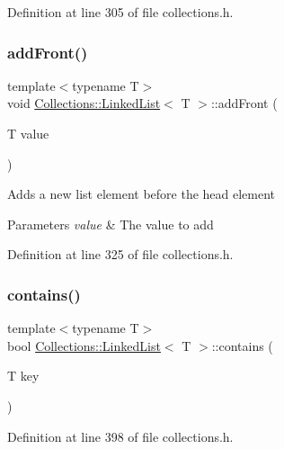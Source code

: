 Definition at line 305 of file collections.\+h.

\hypertarget{class_collections_1_1_linked_list_a018e80a402059f6be8766539a019bfd8}{}\label{class_collections_1_1_linked_list_a018e80a402059f6be8766539a019bfd8} 
\subsubsection{\texorpdfstring{add\+Front()}{addFront()}}
{\footnotesize\ttfamily template$<$typename T$>$ \\
void \hyperlink{class_collections_1_1_linked_list}{Collections\+::\+Linked\+List}$<$ T $>$\+::add\+Front (\begin{DoxyParamCaption}\item[{T}]{value }\end{DoxyParamCaption})}

Adds a new list element before the head element 
\begin{DoxyParams}{Parameters}
{\em value} & The value to add \\
\hline
\end{DoxyParams}


Definition at line 325 of file collections.\+h.

\hypertarget{class_collections_1_1_linked_list_aba10a5308e624f78fe9f356b144e61fa}{}\label{class_collections_1_1_linked_list_aba10a5308e624f78fe9f356b144e61fa} 
\subsubsection{\texorpdfstring{contains()}{contains()}}
{\footnotesize\ttfamily template$<$typename T$>$ \\
bool \hyperlink{class_collections_1_1_linked_list}{Collections\+::\+Linked\+List}$<$ T $>$\+::contains (\begin{DoxyParamCaption}\item[{T}]{key }\end{DoxyParamCaption})}



Definition at line 398 of file collections.\+h.

\hypertarget{class_collections_1_1_linked_list_a854255c40752578a69367417f370545c}{}\label{class_collections_1_1_linked_list_a854255c40752578a69367417f370545c} 
